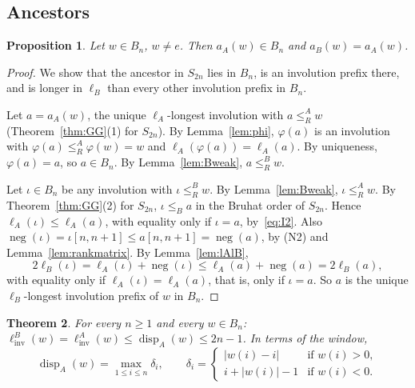 \documentclass[11pt]{amsart}
\newtheorem{theorem}{Theorem}[section]
\newtheorem{proposition}[theorem]{Proposition}
\theoremstyle{definition}
\theoremstyle{remark}
\numberwithin{equation}{section}
\newcommand{\linv}{\ell_{\mathrm{inv}}}
\newcommand{\leR}{\le_R}
\newcommand{\leB}{\le_B}
\newcommand{\abs}[1]{\lvert #1\rvert}
\DeclareMathOperator{\disp}{disp}
\DeclareMathOperator{\negB}{neg}
\begin{document}
\subsection{Ancestors}

\begin{proposition}\label{prop:Bancestor}
Let \(w\in B_n\), \(w\neq e\). Then \(a_A(w)\in B_n\) and \(a_B(w)=a_A(w)\).
\end{proposition}

\begin{proof}
We show that the ancestor in \(S_{2n}\) lies in \(B_n\), is an involution prefix there, and is longer in \(\ell_B\) than every other involution prefix in \(B_n\).

Let \(a=a_A(w)\), the unique \(\ell_A\)-longest involution with \(a\leR^A w\) (Theorem~\ref{thm:GG}(1) for \(S_{2n}\)). By Lemma~\ref{lem:phi}, \(\varphi(a)\) is an involution with \(\varphi(a)\leR^A\varphi(w)=w\) and \(\ell_A(\varphi(a))=\ell_A(a)\). By uniqueness, \(\varphi(a)=a\), so \(a\in B_n\). By Lemma~\ref{lem:Bweak}, \(a\leR^B w\).

Let \(\iota\in B_n\) be any involution with \(\iota\leR^B w\). By Lemma~\ref{lem:Bweak}, \(\iota\leR^A w\). By Theorem~\ref{thm:GG}(2) for \(S_{2n}\), \(\iota\leB a\) in the Bruhat order of \(S_{2n}\). Hence \(\ell_A(\iota)\le\ell_A(a)\), with equality only if \(\iota=a\), by~\eqref{eq:I2}. Also \(\negB(\iota)=\iota[n,n+1]\le a[n,n+1]=\negB(a)\), by (N2) and Lemma~\ref{lem:rankmatrix}. By Lemma~\ref{lem:lAlB},
\[
2\ell_B(\iota)=\ell_A(\iota)+\negB(\iota)\le\ell_A(a)+\negB(a)=2\ell_B(a),
\]
with equality only if \(\ell_A(\iota)=\ell_A(a)\), that is, only if \(\iota=a\). So \(a\) is the unique \(\ell_B\)-longest involution prefix of \(w\) in \(B_n\).
\end{proof}

\begin{theorem}\label{thm:B}
For every \(n\ge1\) and every \(w\in B_n\): \(\linv^B(w)=\linv^A(w)\le\disp_A(w)\le2n-1\). In terms of the window,
\begin{equation}\label{eq:dispB}
\disp_A(w)=\max_{1\le i\le n}\delta_i,\qquad
\delta_i=\begin{cases}\abs{w(i)-i}&\text{if }w(i)>0,\\ i+\abs{w(i)}-1&\text{if }w(i)<0.\end{cases}
\end{equation}
\end{theorem}
\end{document}
